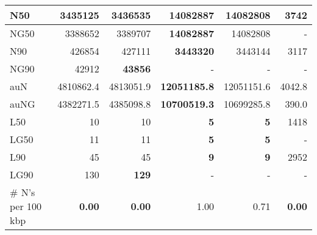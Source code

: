 \documentclass[12pt,a4paper]{article}
\begin{document}
\begin{table}[ht]
\begin{center}
\begin{tabular}{|l*{5}{|r}|}
N50 & 3435125 & 3436535 & {\bf 14082887} & 14082808 & 3742 \\ \hline
NG50 & 3388652 & 3389707 & {\bf 14082887} & 14082808 & - \\ \hline
N90 & 426854 & 427111 & {\bf 3443320} & 3443144 & 3117 \\ \hline
NG90 & 42912 & {\bf 43856} & - & - & - \\ \hline
auN & 4810862.4 & 4813051.9 & {\bf 12051185.8} & 12051151.6 & 4042.8 \\ \hline
auNG & 4382271.5 & 4385098.8 & {\bf 10700519.3} & 10699285.8 & 390.0 \\ \hline
L50 & 10 & 10 & {\bf 5} & {\bf 5} & 1418 \\ \hline
LG50 & 11 & 11 & {\bf 5} & {\bf 5} & - \\ \hline
L90 & 45 & 45 & {\bf 9} & {\bf 9} & 2952 \\ \hline
LG90 & 130 & {\bf 129} & - & - & - \\ \hline
\# N's per 100 kbp & {\bf 0.00} & {\bf 0.00} & 1.00 & 0.71 & {\bf 0.00} \\ \hline
\end{tabular}
\end{center}
\end{table}
\end{document}
